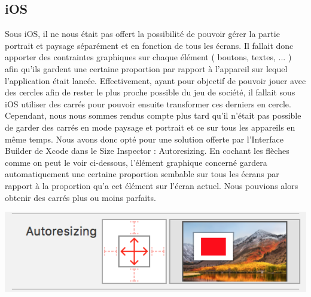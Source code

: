\documentclass{article}
\begin{document}
\subsection{iOS}

Sous iOS, il ne nous \'{e}tait pas offert la possibilit\'{e} de pouvoir g\'{e}rer la partie portrait et paysage s\'{e}par\'{e}ment et en fonction de tous les \'{e}crans. Il fallait donc apporter des contraintes graphiques sur chaque \'{e}l\'{e}ment ( boutons, textes, ... ) afin qu'ils gardent une certaine proportion par rapport \`{a} l'appareil sur lequel l'application \'{e}tait lanc\'{e}e. Effectivement, ayant pour objectif de pouvoir jouer avec des cercles afin de rester le plus proche possible du jeu de soci\'{e}t\'{e}, il fallait sous iOS utiliser des carr\'{e}s pour pouvoir ensuite transformer ces derniers en cercle. Cependant, nous nous sommes rendus compte plus tard qu'il n'\'{e}tait pas possible de garder des carr\'{e}s en mode paysage et portrait et ce sur tous les appareils en m\^{e}me temps. Nous avons donc opt\'{e} pour une solution offerte par l'Interface Builder de Xcode dans le Size Inspector : Autoresizing. En cochant les fl\`{e}ches comme on peut le voir ci-dessous, l'\'{e}l\'{e}ment graphique concern\'{e} gardera automatiquement une certaine proportion sembable sur tous les \'{e}crans par rapport \`{a} la proportion qu'a cet \'{e}l\'{e}ment sur l'\'{e}cran actuel. Nous pouvions alors obtenir des carr\'{e}s plus ou moins parfaits.
\begin{center}
\includegraphics{Autoresizing}
\end{center}
\end{document}
